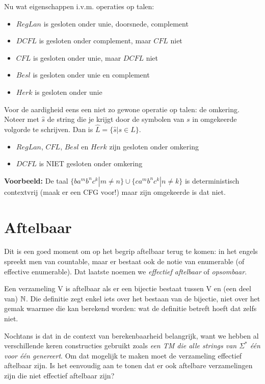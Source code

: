 Nu wat eigenschappen i.v.m. operaties op talen:

\begin{itemize}
\item[] $RegLan$ is gesloten onder unie, doorsnede, complement
\item[] $DCFL$ is gesloten onder complement, maar $CFL$ niet
\item[] $CFL$ is gesloten onder unie, maar $DCFL$ niet
\item[] $Besl$ is gesloten onder unie en complement
\item[] $Herk$ is gesloten onder unie
\end{itemize}


Voor de aardigheid eens een niet zo gewone operatie op talen: de
omkering. Noteer met $\hat{s}$ de string die je krijgt door de
symbolen van $s$ in omgekeerde volgorde te schrijven. Dan is
$\widehat{L} = \{\hat{s}|s \in L\}$.

\begin{itemize}
\item[] $RegLan$, $CFL$, $Besl$ en $Herk$ zijn gesloten onder omkering
\item[] $DCFL$ is NIET gesloten onder omkering
\end{itemize}

{\bf Voorbeeld:} De taal
%
$\{ba^mb^nc^k|m \neq n\} \cup \{ca^mb^nc^k|n \neq k\}$ is 
deterministisch contextvrij (maak er een CFG voor!) maar zijn
omgekeerde is dat niet.


\section{Aftelbaar}

Dit is een goed moment om op het begrip aftelbaar terug te komen: in
het engels spreekt men van countable, maar er bestaat ook de notie van
enumerable (of effective enumerable). Dat laatste noemen we {\em
effectief aftelbaar} of {\em opsombaar}.

Een verzameling V is aftelbaar als er een bijectie bestaat tussen V en
(een deel van) $\mathbb{N}$. Die definitie zegt enkel iets over het bestaan
van de bijectie, niet over het gemak waarmee die kan berekend worden:
wat de definitie betreft hoeft dat zelfs niet.


Nochtans is dat in de context van berekenbaarheid belangrijk, want we
hebben al verschillende keren constructies gebruikt zoals {\em een TM
die alle strings van $\Sigma^*$ \'{e}\'{e}n voor \'{e}\'{e}n
genereert}. Om dat mogelijk te maken moet de verzameling effectief
aftelbaar zijn. Is het eenvoudig aan te tonen dat er ook aftelbare
verzamelingen zijn die niet effectief aftelbaar zijn?  


